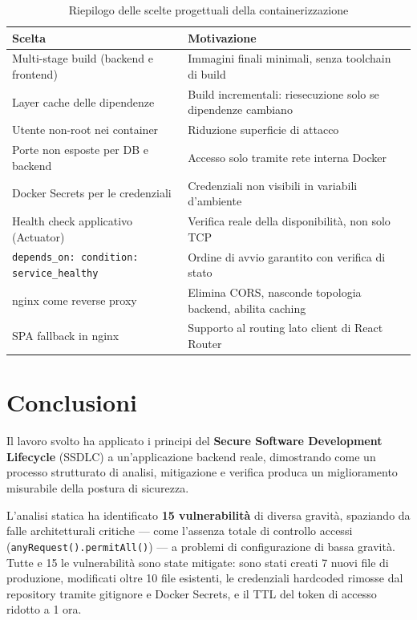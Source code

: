 \documentclass[12pt, a4paper]{article}
\begin{document}
    \begin{table}[H]
        \centering
        \renewcommand{\arraystretch}{1.3}
        \begin{tabular}{lll}
            \hline
            \textbf{Scelta} & \textbf{Motivazione} \\
            \hline
            Multi-stage build (backend e frontend) & Immagini finali minimali, senza toolchain di build \\
            Layer cache delle dipendenze & Build incrementali: riesecuzione solo se dipendenze cambiano \\
            Utente non-root nei container & Riduzione superficie di attacco \\
            Porte non esposte per DB e backend & Accesso solo tramite rete interna Docker \\
            Docker Secrets per le credenziali & Credenziali non visibili in variabili d'ambiente \\
            Health check applicativo (Actuator) & Verifica reale della disponibilità, non solo TCP \\
            \texttt{depends\_on: condition: service\_healthy} & Ordine di avvio garantito con verifica di stato \\
            nginx come reverse proxy & Elimina CORS, nasconde topologia backend, abilita caching \\
            SPA fallback in nginx & Supporto al routing lato client di React Router \\
            \hline
        \end{tabular}
        \caption{Riepilogo delle scelte progettuali della containerizzazione}
        \label{tab:docker-choices}
    \end{table}
    \section{Conclusioni}

    Il lavoro svolto ha applicato i principi del \textbf{Secure Software Development
    Lifecycle} (SSDLC) a un'applicazione backend reale, dimostrando come un processo
    strutturato di analisi, mitigazione e verifica produca un miglioramento misurabile
    della postura di sicurezza.

    L'analisi statica ha identificato \textbf{15 vulnerabilità} di diversa gravità,
    spaziando da falle architetturali critiche --- come l'assenza totale di controllo
    accessi (\texttt{anyRequest().permitAll()}) --- a problemi di configurazione di
    bassa gravità. Tutte e 15 le vulnerabilità sono state mitigate: sono stati creati
    7 nuovi file di produzione, modificati oltre 10 file esistenti, le credenziali
    hardcoded rimosse dal repository tramite gitignore e Docker Secrets, e il TTL
    del token di accesso ridotto a 1 ora.
\end{document}
